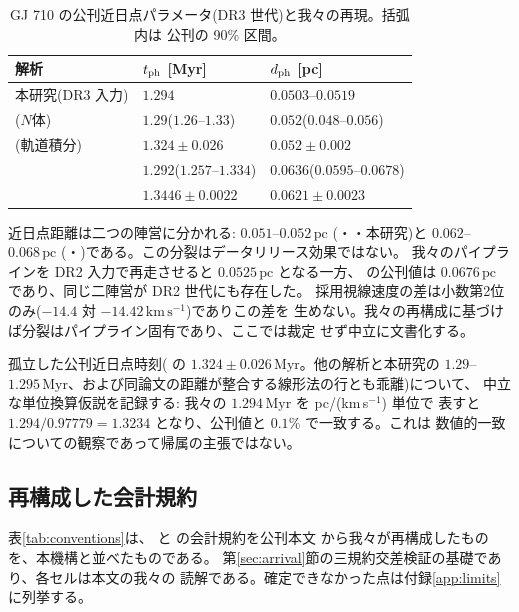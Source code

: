 \documentclass[11pt]{article}
\newcommand{\Myr}{\,\mathrm{Myr}}
\newcommand{\pc}{\,\mathrm{pc}}
\newcommand{\kms}{\,\mathrm{km\,s^{-1}}}
\begin{document}
\begin{table}[h]\centering
\begin{tabular}{lll}
\toprule
解析 & $t_{\rm ph}$ [Myr] & $d_{\rm ph}$ [pc] \\
\midrule
本研究(DR3 入力) & $1.294$ & $0.0503$--$0.0519$ \\
\cite{dlfm22}($N$体) & $1.29$($1.26$--$1.33$) & $0.052$($0.048$--$0.056$) \\
\cite{bb22}(軌道積分) & $1.324\pm0.026$ & $0.052\pm0.002$ \\
\cite{bj22} & $1.292$($1.257$--$1.334$) & $0.0636$($0.0595$--$0.0678$) \\
\cite{fp26} & $1.3446\pm0.0022$ & $0.0621\pm0.0023$ \\
\bottomrule
\end{tabular}
\caption{GJ 710 の公刊近日点パラメータ(DR3 世代)と我々の再現。括弧内は
公刊の 90\% 区間。}
\label{tab:gj710}
\end{table}

近日点距離は二つの陣営に分かれる: $0.051$--$0.052\pc$
(\cite{dlfm22}・\cite{bb22}・本研究)と $0.062$--$0.068\pc$
(\cite{bj22}・\cite{fp26})である。この分裂はデータリリース効果ではない。
我々のパイプラインを DR2 入力で再走させると $0.0525\pc$ となる一方、
\cite{bj18} の公刊値は $0.0676\pc$ であり、同じ二陣営が DR2 世代にも存在した。
採用視線速度の差は小数第2位のみ($-14.4$ 対 $-14.42\kms$)でありこの差を
生めない。我々の再構成に基づけば分裂はパイプライン固有であり、ここでは裁定
せず中立に文書化する。

孤立した公刊近日点時刻(\cite{bb22} の $1.324\pm0.026\Myr$。他の解析と本研究の
$1.29$--$1.295\Myr$、および同論文の距離が整合する線形法の行とも乖離)について、
中立な単位換算仮説を記録する: 我々の $1.294\Myr$ を pc/(km\,s$^{-1}$) 単位で
表すと $1.294/0.97779=1.3234$ となり、公刊値と $0.1\%$ で一致する。これは
数値的一致についての観察であって帰属の主張ではない。

\subsection{再構成した会計規約}\label{app:acctab}
表\ref{tab:conventions}は、\cite{bj18} と \cite{fp26} の会計規約を公刊本文
から我々が再構成したものを、本機構と並べたものである。
第\ref{sec:arrival}節の三規約交差検証の基礎であり、各セルは本文の我々の
読解である。確定できなかった点は付録\ref{app:limits}に列挙する。
\end{document}

